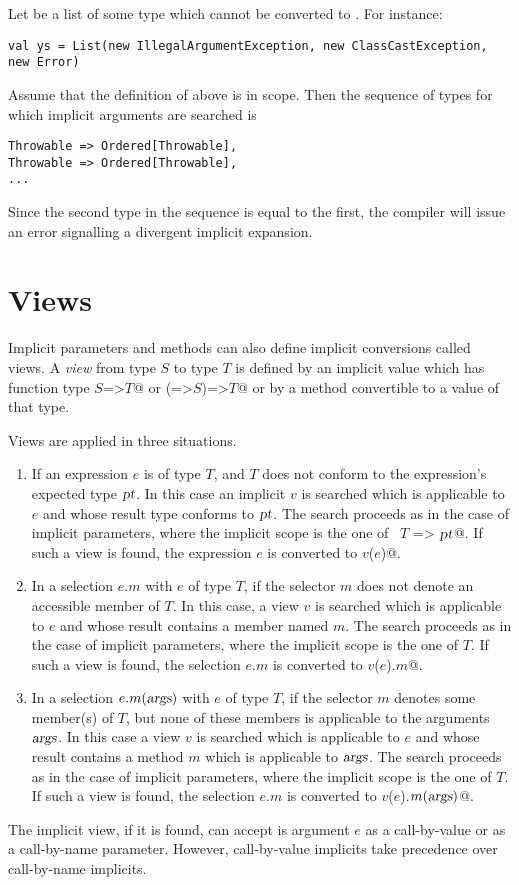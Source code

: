 \example Let  be a list of some type which cannot be converted
to . For instance:
\begin{lstlisting}
val ys = List(new IllegalArgumentException, new ClassCastException, new Error)
\end{lstlisting}
Assume that the definition of  above is in scope. Then the sequence
of types for which implicit arguments are searched is 
\begin{lstlisting}
Throwable => Ordered[Throwable],
Throwable => Ordered[Throwable],
...
\end{lstlisting}
Since the second type in the sequence is equal to the first, the compiler
will issue an error signalling a divergent implicit expansion.

\section{Views}\label{sec:views}

Implicit parameters and methods can also define implicit conversions
called views. A {\em view} from type $S$ to type $T$ is
defined by an implicit value which has function type
\lstinline@$S$=>$T$@ or \lstinline@(=>$S$)=>$T$@ or by a method convertible to a value of that
type.

Views are applied in three situations.
\begin{enumerate}
\item
If an expression $e$ is of type $T$, and $T$ does not conform to the
expression's expected type $\mbox{\sl pt}$. In this case an implicit $v$ is
searched which is applicable to $e$ and whose result type conforms to
$\mbox{\sl pt}$.  The search proceeds as in the case of implicit parameters,
where the implicit scope is the one of ~\lstinline@$T$ => $\mbox{\sl pt}$@. If
such a view is found, the expression $e$ is converted to
\lstinline@$v$($e$)@. 
\item
In a selection $e.m$ with $e$ of type $T$, if the selector $m$ does
not denote an accessible member of $T$.  In this case, a view $v$ is searched
which is applicable to $e$ and whose result contains a member named
$m$.  The search proceeds as in the case of implicit parameters, where
the implicit scope is the one of $T$.  If such a view is found, the
selection $e.m$ is converted to \lstinline@$v$($e$).$m$@.
\item
In a selection $e.m(\mbox{\sl args})$ with $e$ of type $T$, if the selector
$m$ denotes some member(s) of $T$, but none of these members is applicable to the arguments
$\mbox{\sl args}$. In this case a view $v$ is searched which is applicable to $e$ 
and whose result contains a method $m$ which is applicable to $\mbox{\sl args}$.
The search proceeds as in the case of implicit parameters, where
the implicit scope is the one of $T$.  If such a view is found, the
selection $e.m$ is converted to \lstinline@$v$($e$).$m(\mbox{\sl args})$@.
\end{enumerate}
The implicit view, if it is found, can accept is argument $e$ as a
call-by-value or as a call-by-name parameter. However, call-by-value
implicits take precedence over call-by-name implicits.

